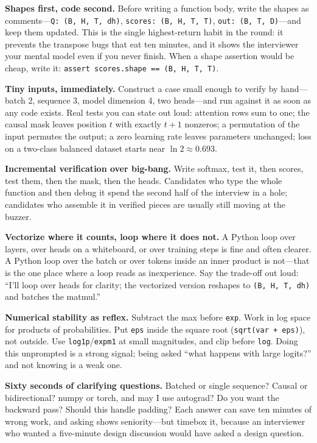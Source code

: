 \textbf{Shapes first, code second.} Before writing a function body, write the shapes as comments---\texttt{Q: (B, H, T, dh)}, \texttt{scores: (B, H, T, T)}, \texttt{out: (B, T, D)}---and keep them updated. This is the single highest-return habit in the round: it prevents the transpose bugs that eat ten minutes, and it shows the interviewer your mental model even if you never finish. When a shape assertion would be cheap, write it: \texttt{assert scores.shape == (B, H, T, T)}.

\textbf{Tiny inputs, immediately.} Construct a case small enough to verify by hand---batch 2, sequence 3, model dimension 4, two heads---and run against it as soon as any code exists. Real tests you can state out loud: attention rows sum to one; the causal mask leaves position $t$ with exactly $t+1$ nonzeros; a permutation of the input permutes the output; a zero learning rate leaves parameters unchanged; loss on a two-class balanced dataset starts near $\ln 2 \approx 0.693$.

\textbf{Incremental verification over big-bang.} Write softmax, test it, then scores, test them, then the mask, then the heads. Candidates who type the whole function and then debug it spend the second half of the interview in a hole; candidates who assemble it in verified pieces are usually still moving at the buzzer.

\textbf{Vectorize where it counts, loop where it does not.} A Python loop over layers, over heads on a whiteboard, or over training steps is fine and often clearer. A Python loop over the batch or over tokens inside an inner product is not---that is the one place where a loop reads as inexperience. Say the trade-off out loud: ``I'll loop over heads for clarity; the vectorized version reshapes to \texttt{(B, H, T, dh)} and batches the matmul.''

\textbf{Numerical stability as reflex.} Subtract the max before \texttt{exp}. Work in log space for products of probabilities. Put \texttt{eps} inside the square root (\texttt{sqrt(var + eps)}), not outside. Use \texttt{log1p}/\texttt{expm1} at small magnitudes, and clip before \texttt{log}. Doing this unprompted is a strong signal; being asked ``what happens with large logits?'' and not knowing is a weak one.

\textbf{Sixty seconds of clarifying questions.} Batched or single sequence? Causal or bidirectional? numpy or torch, and may I use autograd? Do you want the backward pass? Should this handle padding? Each answer can save ten minutes of wrong work, and asking shows seniority---but timebox it, because an interviewer who wanted a five-minute design discussion would have asked a design question.

